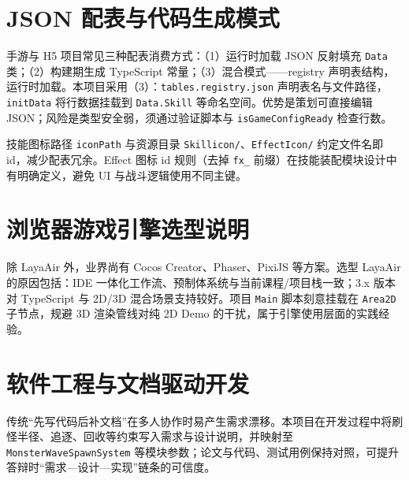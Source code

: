 \section{JSON 配表与代码生成模式}

手游与 H5 项目常见三种配表消费方式：（1）运行时加载 JSON 反射填充 \texttt{Data} 类；（2）构建期生成 TypeScript 常量；（3）混合模式——registry 声明表结构，运行时加载。本项目采用（3）：\texttt{tables.registry.json} 声明表名与文件路径，\texttt{initData} 将行数据挂载到 \texttt{Data.Skill} 等命名空间\cite{gregory2018game}。优势是策划可直接编辑 JSON；风险是类型安全弱，须通过验证脚本与 \texttt{isGameConfigReady} 检查行数。

技能图标路径 \texttt{iconPath} 与资源目录 \texttt{Skillicon/}、\texttt{EffectIcon/} 约定文件名即 id，减少配表冗余。Effect 图标 id 规则（去掉 \texttt{fx\_} 前缀）在技能装配模块设计中有明确定义，避免 UI 与战斗逻辑使用不同主键。

\section{浏览器游戏引擎选型说明}

除 LayaAir 外，业界尚有 Cocos Creator、Phaser、PixiJS 等方案\cite{goslin2004panda}。选型 LayaAir 的原因包括：IDE 一体化工作流、预制体系统与当前课程/项目栈一致；3.x 版本对 TypeScript 与 2D/3D 混合场景支持较好。项目 \texttt{Main} 脚本刻意挂载在 \texttt{Area2D} 子节点，规避 3D 渲染管线对纯 2D Demo 的干扰，属于引擎使用层面的实践经验。

\section{软件工程与文档驱动开发}

传统“先写代码后补文档”在多人协作时易产生需求漂移。本项目在开发过程中将刷怪半径、追逐、回收等约束写入需求与设计说明，并映射至 \texttt{MonsterWaveSpawnSystem} 等模块参数；论文与代码、测试用例保持对照，可提升答辩时“需求—设计—实现”链条的可信度\cite{munaiah2017github}。
